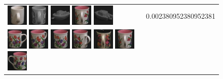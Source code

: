 \begin{figure}[!bp]
\begin{tabular}{m{11cm} | m{3cm} |}
\includegraphics[width=1cm]{coil/beeld-41.eps}
\includegraphics[width=1cm]{coil/beeld-53.eps}
\includegraphics[width=1cm]{coil/beeld-27.eps}
\includegraphics[width=1cm]{coil/beeld-11.eps}
\includegraphics[width=1cm]{coil/beeld-28.eps}
& {\scriptsize 0.002380952380952381}
\\
\includegraphics[width=1cm]{coil/beeld-6.eps}
\includegraphics[width=1cm]{coil/beeld-9.eps}
\includegraphics[width=1cm]{coil/beeld-8.eps}
\includegraphics[width=1cm]{coil/beeld-10.eps}
\includegraphics[width=1cm]{coil/beeld-65.eps}
\includegraphics[width=1cm]{coil/beeld-11.eps}
\includegraphics[width=1cm]{coil/beeld-7.eps}

\end{tabular}
\end{figure}
